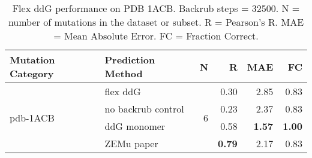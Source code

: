 \begin{table}
  \begin{tabular}{llrrrr}
\toprule
Mutation Category &   Prediction Method &  N &    R &  MAE &   FC \\
\midrule
 \multirow{ 4}{*}{pdb-1ACB} & flex ddG & \multirow{ 4}{*}{6} & 0.30 & 2.85 & 0.83  \\
 & no backrub control & & 0.23 & 2.37 & 0.83  \\
 & ddG monomer & & 0.58 & \textbf{1.57} & \textbf{1.00}  \\
 & ZEMu paper & & \textbf{0.79} & 2.17 & 0.83  \\
\bottomrule
\end{tabular}
  \caption[Flex ddG performance on PDB 1ACB]{
    Flex ddG performance on PDB 1ACB. Backrub steps = 32500. N = number of mutations in the dataset or subset. R = Pearson's R. MAE = Mean Absolute Error. FC = Fraction Correct.
  } \label{tab:table-pdb-1ACB}
\end{table}
